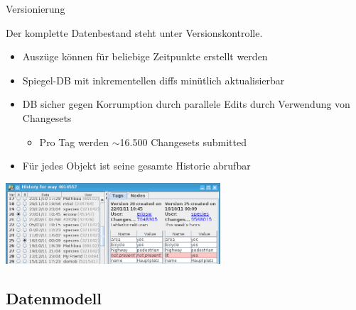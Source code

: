 \documentclass{beamer}
\begin{document}
\begin{frame}{Versionierung}

Der komplette Datenbestand steht unter Versionskontrolle.
\begin{itemize}
  \item Auszüge können für beliebige Zeitpunkte erstellt werden
  \item Spiegel-DB mit inkrementellen diffs minütlich aktualisierbar
  \item DB sicher gegen Korrumption durch parallele Edits durch Verwendung von Changesets
  \begin{itemize}
    \item Pro Tag werden $\sim$16.500 Changesets submitted
  \end{itemize}
  \item Für jedes Objekt ist seine gesamte Historie abrufbar
\end{itemize}

 \hfill \includegraphics[width=8cm]{history.png}


\end{frame}

\subsection{Datenmodell}
\end{document}
